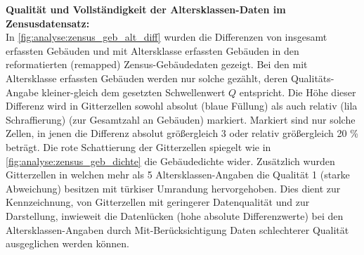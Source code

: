 			\textbf{Qualität und Vollständigkeit der Altersklassen-Daten im Zensusdatensatz:}\\
			In \autoref{fig:analyse:zensus_geb_alt_diff} wurden die Differenzen von insgesamt erfassten Gebäuden und mit Altersklasse erfassten Gebäuden in den reformatierten (remapped) Zensus-Gebäudedaten gezeigt. Bei den mit Altersklasse erfassten Gebäuden werden nur solche gezählt, deren Qualitäts-Angabe kleiner-gleich dem gesetzten Schwellenwert $Q$ entspricht. Die Höhe dieser Differenz wird in Gitterzellen sowohl absolut (blaue Füllung) als auch relativ (lila Schraffierung) (zur Gesamtzahl an Gebäuden) markiert. Markiert sind nur solche Zellen, in jenen die Differenz absolut größergleich 3 oder relativ größergleich 20 \% beträgt. Die rote Schattierung der Gitterzellen spiegelt wie in \autoref{fig:analyse:zensus_geb_dichte} die Gebäudedichte wider. Zusätzlich wurden Gitterzellen in welchen mehr als 5 Altersklassen-Angaben die Qualität 1 (starke Abweichung) besitzen mit türkiser Umrandung hervorgehoben. Dies dient zur Kennzeichnung, von Gitterzellen mit geringerer Datenqualität und zur Darstellung, inwieweit die Datenlücken (hohe absolute Differenzwerte) bei den Altersklassen-Angaben durch Mit-Berücksichtigung Daten schlechterer Qualität ausgeglichen werden können.
	
